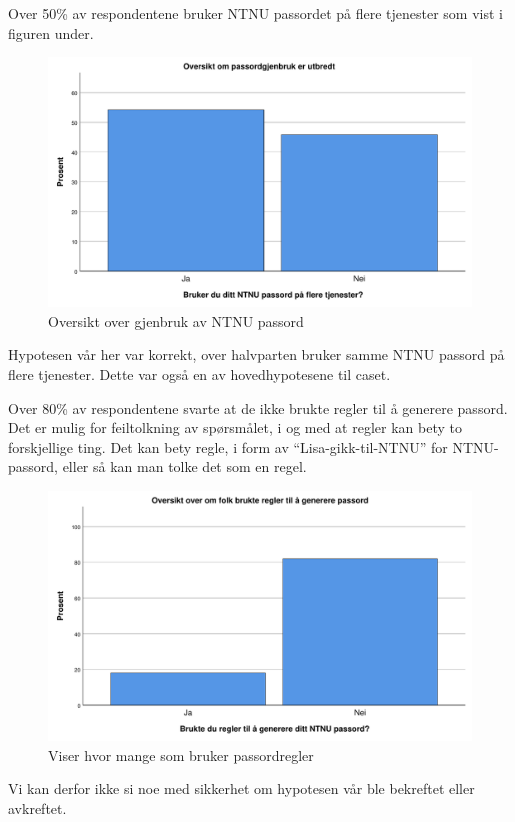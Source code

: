 Over 50\% av respondentene bruker NTNU passordet på flere tjenester som vist i figuren under. 
\begin{figure}[H]
    \centering
    \includegraphics[scale=0.5]{case_2/bilder/spss/passordgjenbruk.pdf}
    \caption[Frekvens av passordgjenbruk]{Oversikt over gjenbruk av NTNU passord}
    \label{fig:case2-passordgjenbruk}
\end{figure}
Hypotesen vår her var korrekt, over halvparten bruker samme NTNU passord på flere tjenester. Dette var også en av hovedhypotesene til caset. 

Over 80\% av respondentene svarte at de ikke brukte regler til å generere passord. Det er mulig for feiltolkning av spørsmålet, i og med at regler kan bety to forskjellige ting. Det kan bety regle, i form av ``Lisa-gikk-til-NTNU'' for NTNU-passord, eller så kan man tolke det som en regel. 
\begin{figure}[H]
    \centering
    \includegraphics[scale=0.5]{case_2/bilder/spss/regler_passord.pdf}
    \caption[Bruk av passordregler]{Viser hvor mange som bruker passordregler}
    \label{fig:case2-passordregler}
\end{figure}
Vi kan derfor ikke si noe med sikkerhet om hypotesen vår ble bekreftet eller avkreftet.

